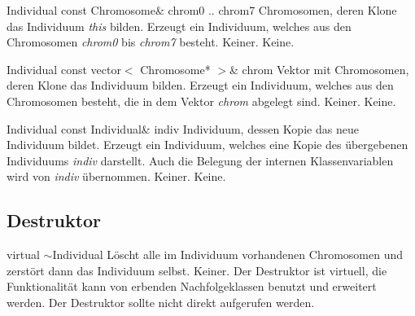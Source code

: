 \documentclass{report}
\begin{document}
\vspace{4ex}

\setNormalInstance
\printMethodWithOneParam
{}
{Individual}
{const Chromosome\&}
{chrom0 .. chrom7}
{Chromosomen, deren Klone das Individuum {\em this} bilden.}
{Erzeugt ein Individuum, welches aus den Chromosomen
 {\em chrom0} bis {\em chrom7} besteht.}
{Keiner.}
{Keine.}

\newpage

\setNormalInstance
\printMethodWithOneParam
{}
{Individual}
{const vector$<$ Chromosome* $>$\&}
{chrom}
{Vektor mit Chromosomen, deren Klone das
                            Individuum bilden.}
{Erzeugt ein Individuum, welches aus den Chromosomen
    besteht, die in dem Vektor {\em chrom} abgelegt sind.}
{Keiner.}
{Keine.}

\vspace{4ex}

\setNormalInstance
\printMethodWithOneParam
{}
{Individual}
{const Individual\&}
{indiv}
{Individuum, dessen Kopie das neue Individuum
                            bildet.}
{Erzeugt ein Individuum, welches eine Kopie des
    \"ubergebenen Individuums {\em indiv} darstellt. Auch die Belegung der
    internen Klassenvariablen wird von {\em indiv} \"ubernommen.}
{Keiner.}
{Keine.}

\subsection{Destruktor}

\printEmptyMethodReturnSpecial
{virtual}
{$\sim$Individual}
{L\"oscht alle im Individuum vorhandenen Chromosomen und zerst\"ort dann das 
 Individuum selbst.}
{Keiner.}
{Der Destruktor ist virtuell, die Funktionalit\"at kann von erbenden 
 Nachfolgeklassen benutzt und erweitert werden. Der Destruktor sollte nicht 
 direkt aufgerufen werden.}

\newpage
\end{document}
